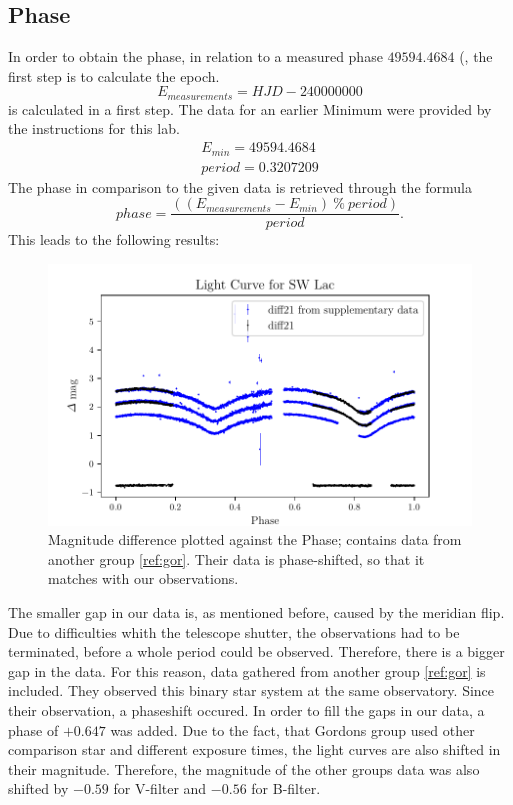 \subsection{Phase}
  \label{sec:again}
  In order to obtain the phase, in relation to a measured phase $49594.4684$ (, the first step is to calculate the epoch.
  \begin{equation*}
    E_{measurements} = HJD - 240000000
  \end{equation*}
  is calculated in a first step. The data for an earlier Minimum were provided by the 
  instructions for this lab. 
  \begin{align*}
    E_{min} = 49594.4684\\
    period = 0.3207209
  \end{align*}
  The phase in comparison to the given data is retrieved through the formula
  \begin{equation}
    phase = \dfrac{((E_{measurements}-E_{min})\ \% \ period)}{period}.
  \end{equation}
  This leads to the following results:
  \begin{figure}[H]
    \centering
    \includegraphics{gdPhase.pdf}
    \caption{Magnitude difference plotted against the Phase; contains data from another group
    \ref{ref:gor}. Their data is phase-shifted, so that it matches with our observations.}
    \label{fig:phase}
  \end{figure}
  \noindent The smaller gap in our data is, as mentioned before, caused by the meridian flip. 
  Due to difficulties whith the telescope shutter, the observations had to be terminated, 
  before a whole period could be observed. Therefore, there is a bigger gap in the 
  data. For this reason, data gathered from another group \ref{ref:gor} is included. 
  They observed this binary star system at the same observatory. Since their
  observation, a phaseshift occured. In order to fill the gaps in our data,
  a phase of $+0.647$ was added. Due to the fact, that Gordons group used other 
  comparison star and different exposure times, the light curves are also shifted in their
  magnitude. Therefore, the magnitude of the other groups data was also shifted
  by $-0.59$ for V-filter and $-0.56$ for B-filter.\\
 
